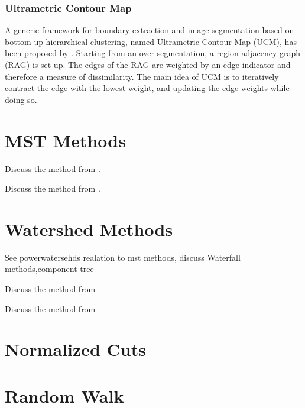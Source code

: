 \subsubsection{Ultrametric Contour Map}\label{sec:hc_ucm}

A generic framework for boundary extraction and image segmentation based
on bottom-up hierarchical clustering, named Ultrametric Contour Map (UCM), 
has been proposed by \citet{arbelaez_2006_cvpr} . 
Starting from an over-segmentation, a region adjacency graph (RAG) is set up.
The edges of the RAG are weighted by an edge indicator and therefore a measure  of dissimilarity.
The main idea of UCM is to iteratively contract the edge with the lowest weight, 
and updating the edge weights while doing so.

\section{MST Methods}\label{sec:rw_mst_methods}


Discuss the method from \citet{felzenszwalb_2004_ijcv}.


Discuss the method from \citet{Straehle_k-smallestspanning}.



\section{Watershed Methods}

See powerwatersehds realation to mst methods,
discuss Waterfall methods,component tree

Discuss the method from \citet{straehle_2011_miccai}


Discuss the method from \citet{straehle_2012_cvpr}


\section{Normalized Cuts}


\section{Random Walk}
